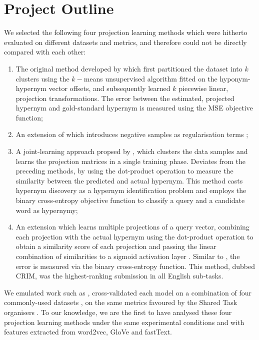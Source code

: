 \section{Project Outline} %
We selected the following four projection learning methods which were hitherto evaluated on different datasets and metrics, and  therefore could not be directly compared with each other:
\begin{enumerate}
    \item The original method developed by \citet{Fu2014} which first partitioned the dataset into $k$ clusters using the $k-$means unsupervised algorithm fitted on the hyponym-hypernym vector offsets, and subsequently learned $k$ piecewise linear, projection transformations.  The error between the estimated, projected hypernym and gold-standard hypernym is measured using the \ac{MSE} objective function;
    \item An extension of \citep{Fu2014} which introduces negative samples as regularisation terms \citep{ustalov2017negative};
    \item A joint-learning approach propsed by \citet{yamane2016distributional}, which clusters the data samples and learns the projection matrices in a single training phase.  Deviates from the preceding methods, by using the dot-product operation to measure the similarity between the predicted and actual hypernym.  This method casts hypernym discovery as a hypernym identification problem and employs the binary cross-entropy objective function to classify a query and a candidate word as hypernymy;
    \item An extension \citet{yamane2016distributional} which learns multiple projections of a query vector, combining each projection with the actual hypernym using the dot-product operation to obtain a similarity score of each projection and passing the linear combination of similarities to a sigmoid activation layer \citep{bernier2018crim}.  Similar to \citet{yamane2016distributional}, the error is measured via the binary cross-entropy function.  This method, dubbed CRIM, was the highest-ranking submission in all English sub-tasks.
\end{enumerate}
We emulated work such as \citep{shwartz2017siege, levy2015supervised}, cross-validated each model on a combination of four commonly-used datasets \citep{santus2015evalution, Baroni2011, santus2016nine, necsulescu2015reading}, on the same metrics favoured by the Shared Task organisers \citep{camacho2018semeval}.  To our knowledge, we are the first to have analysed these four projection learning methods under the same experimental conditions and with features extracted from word2vec, GloVe and fastText.

